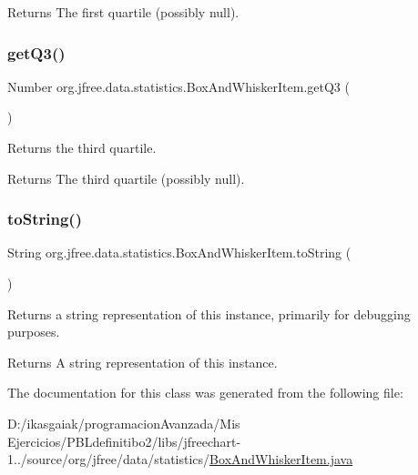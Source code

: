 \begin{DoxyReturn}{Returns}
The first quartile (possibly {\ttfamily null}). 
\end{DoxyReturn}
\mbox{\label{classorg_1_1jfree_1_1data_1_1statistics_1_1_box_and_whisker_item_a4830fcff71e8201b297fe5705d939332}} 
\subsubsection{\texorpdfstring{get\+Q3()}{getQ3()}}
{\footnotesize\ttfamily Number org.\+jfree.\+data.\+statistics.\+Box\+And\+Whisker\+Item.\+get\+Q3 (\begin{DoxyParamCaption}{ }\end{DoxyParamCaption})}

Returns the third quartile.

\begin{DoxyReturn}{Returns}
The third quartile (possibly {\ttfamily null}). 
\end{DoxyReturn}
\mbox{\label{classorg_1_1jfree_1_1data_1_1statistics_1_1_box_and_whisker_item_aafebe700ebe4c9859e7583f022c4e0ee}} 
\subsubsection{\texorpdfstring{to\+String()}{toString()}}
{\footnotesize\ttfamily String org.\+jfree.\+data.\+statistics.\+Box\+And\+Whisker\+Item.\+to\+String (\begin{DoxyParamCaption}{ }\end{DoxyParamCaption})}

Returns a string representation of this instance, primarily for debugging purposes.

\begin{DoxyReturn}{Returns}
A string representation of this instance. 
\end{DoxyReturn}


The documentation for this class was generated from the following file\+:\begin{DoxyCompactItemize}
\item 
D\+:/ikasgaiak/programacion\+Avanzada/\+Mis Ejercicios/\+P\+B\+Ldefinitibo2/libs/jfreechart-\/1../source/org/jfree/data/statistics/\mbox{\hyperlink{_box_and_whisker_item_8java}{Box\+And\+Whisker\+Item.\+java}}\end{DoxyCompactItemize}
